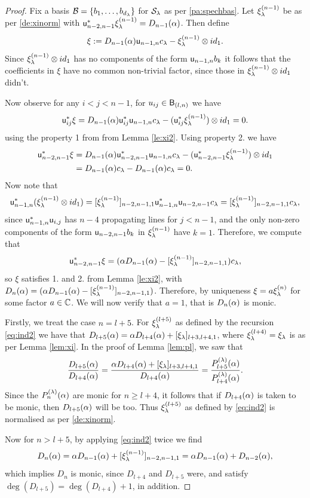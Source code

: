 \begin{proof} Fix a basis $\mathcal{B}=\{b_1,\dots, b_{d_\lambda}\}$ for $\mathcal{S}_\lambda$ as per \ref{pa:spechbas}. Let $\xi_{\lambda}^{(n-1)}$ be as per \ref{de:xinorm} with ${\mathsf u}_{n-2,n-1}^*\xi_{\lambda}^{(n-1)}=D_{n-1}(\alpha)$. Then define
\[\xi:= D_{n-1}(\alpha) {\mathsf u}_{n-1,n}c_{\lambda}-\xi_{\lambda}^{(n-1)}\otimes id_1.\]
Since $\xi_{\lambda}^{(n-1)}\otimes id_1$ has no components of the form ${\mathsf u}_{n-1,n} b_k$ it follows that the coefficients in $\xi$ have no common non-trivial factor, since those in $\xi_{\lambda}^{(n-1)}\otimes id_1$ didn't.

Now observe for any $i<j<n-1$, for $u_{ij}\in {\mathsf B}_{(l,n)}$ we have
\[ {\mathsf u}_{ij}^*\xi=D_{n-1}(\alpha) {\mathsf u}_{ij}^*{\mathsf u}_{n-1,n}c_{\lambda}-({\mathsf u}_{ij}^*\xi_{\lambda}^{(n-1)})\otimes id_1=0.\]
using the property 1 from from Lemma \ref{le:xi2}. Using property 2. we have 
\begin{align*}
    {\mathsf u}_{n-2,n-1}^*\xi&=D_{n-1}(\alpha) {\mathsf u}_{n-2,n-1}^*{\mathsf u}_{n-1,n}c_{\lambda}-({\mathsf u}_{n-2,n-1}^*\xi_{\lambda}^{(n-1)})\otimes id_1\\
    &=D_{n-1}(\alpha)c_\lambda-D_{n-1}(\alpha)c_\lambda=0.
\end{align*}
Now note that 
\[{\mathsf u}_{n-1,n}^* (\xi_{\lambda}^{(n-1)}\otimes id_1)=[\xi_{\lambda}^{(n-1)}]_{n-2,n-1,1 }{\mathsf u}_{n-1,n}^*{\mathsf u}_{n-2,n-1} c_\lambda=[\xi_{\lambda}^{(n-1)}]_{n-2,n-1,1 } c_\lambda,\]
since ${\mathsf u}_{n-1,n}^*{\mathsf u}_{i,j}$ has $n-4$ propagating lines for $j<n-1$, and the only non-zero components of the form ${\mathsf u}_{n-2,n-1}b_{k}$ in $\xi_{\lambda}^{(n-1)}$ have $k=1$. Therefore, we compute that 
\[{\mathsf u}_{n-2,n-1}^*\xi =(\alpha D_{n-1}(\alpha)-[\xi_{\lambda}^{(n-1)}]_{n-2,n-1,1 })c_\lambda,\]
so $\xi$ satisfies 1. and 2. from Lemma \ref{le:xi2}, with $D_n(\alpha)=(\alpha D_{n-1}(\alpha)-[\xi_{\lambda}^{(n-1)}]_{n-2,n-1,1 })$. Therefore, by uniqueness $\xi= a \xi^{(n)}_\lambda$ for some factor $a\in \mathbb{C}$. We will now verify that $a=1$, that is $D_n(\alpha)$ is monic.

Firstly, we treat the case $n=l+5$. For $\xi^{(l+5)}_\lambda$ as defined by the recursion \eqref{eq:ind2} we have that $D_{l+5}(\alpha)=\alpha D_{l+4}(\alpha) +[\xi_\lambda]_{l+3,l+4,1}$, where $\xi_\lambda^{(l+4)}=\xi_\lambda$ is as per Lemma \ref{lem:xi}. In the proof of Lemma \ref{lem:pl}, we saw that 
\[
\frac{D_{l+5}(\alpha)}{D_{l+4}(\alpha)}=\frac{\alpha D_{l+4}(\alpha)+[\xi_\lambda]_{l+3,l+4,1}}{D_{l+4}(\alpha)}=\frac{P_{l+5}^{(\lambda)}(\alpha)}{P_{l+4}^{(\lambda)}(\alpha)}.
\]
Since the $P_{n}^{(\lambda)}(\alpha)$ are monic for $n\geq l+4$, it follows that if $D_{l+4}(\alpha)$ is taken to be monic, then $D_{l+5}(\alpha)$ will be too. Thus $\xi^{(l+5)}_\lambda$ as defined by \eqref{eq:ind2} is normalised as per \ref{de:xinorm}. 

Now for $n>l+5$, by applying \eqref{eq:ind2} twice we find
\[D_{n}(\alpha)=\alpha D_{n-1}(\alpha)+[\xi_{\lambda}^{(n-1)}]_{n-2,n-1,1 }=\alpha D_{n-1}(\alpha)+D_{n-2}(\alpha),\]
which implies $D_{n}$ is monic, since $D_{l+4}$ and $D_{l+5}$ were, and satisfy $\deg(D_{l+5})=\deg(D_{l+4})+1$, in addition.\end{proof}

